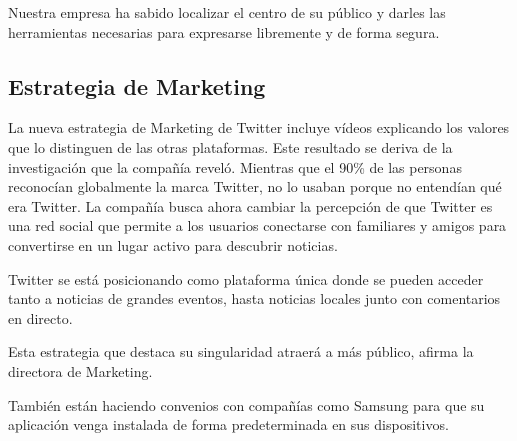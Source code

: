 Nuestra empresa ha sabido localizar el centro de su público y darles las herramientas necesarias para expresarse libremente y de forma segura.

\subsection{Estrategia de Marketing}

La nueva estrategia de Marketing de Twitter incluye vídeos explicando los valores que lo distinguen de las otras plataformas. Este resultado se deriva de la investigación que la compañía reveló. Mientras que el 90\% de las personas reconocían globalmente la marca Twitter, no lo usaban porque no entendían qué era Twitter. La compañía busca ahora cambiar la percepción de que Twitter es una red social que permite a los usuarios conectarse con familiares y amigos para convertirse en un lugar activo para descubrir noticias.

Twitter se está posicionando como plataforma única donde se pueden acceder tanto a noticias de grandes eventos, hasta noticias locales junto con comentarios en directo.

Esta estrategia que destaca su singularidad atraerá a más público, afirma la directora de Marketing.

También están haciendo convenios con compañías como Samsung para que su aplicación venga instalada de forma predeterminada en sus dispositivos.